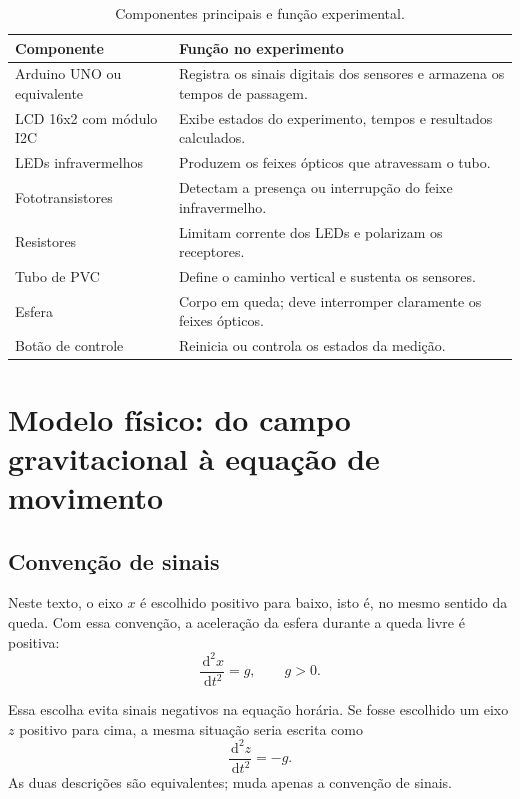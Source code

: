 \documentclass[11pt,a4paper]{article}
\newcommand{\dif}{\,\mathrm{d}}
\begin{document}
\begin{table}[htbp]
\centering
\caption{Componentes principais e função experimental.}
\label{tab:componentes}
\begin{tabularx}{\textwidth}{>{\raggedright\arraybackslash}p{}X}
\toprule
\textbf{Componente} & \textbf{Função no experimento} \\
\midrule
Arduino UNO ou equivalente & Registra os sinais digitais dos sensores e armazena os tempos de passagem. \\
LCD 16x2 com módulo I2C & Exibe estados do experimento, tempos e resultados calculados. \\
LEDs infravermelhos & Produzem os feixes ópticos que atravessam o tubo. \\
Fototransistores & Detectam a presença ou interrupção do feixe infravermelho. \\
Resistores & Limitam corrente dos LEDs e polarizam os receptores. \\
Tubo de PVC & Define o caminho vertical e sustenta os sensores. \\
Esfera & Corpo em queda; deve interromper claramente os feixes ópticos. \\
Botão de controle & Reinicia ou controla os estados da medição. \\
\bottomrule
\end{tabularx}
\end{table}

\section{Modelo físico: do campo gravitacional à equação de movimento}

\subsection{Convenção de sinais}

Neste texto, o eixo $x$ é escolhido positivo para baixo, isto é, no mesmo sentido da queda. Com essa convenção, a aceleração da esfera durante a queda livre é positiva:
\begin{equation}
  \frac{\dif^2x}{\dif t^2}=g,
  \qquad g>0.
  \label{eq:movimento_x_baixo}
\end{equation}

Essa escolha evita sinais negativos na equação horária. Se fosse escolhido um eixo $z$ positivo para cima, a mesma situação seria escrita como
\begin{equation}
  \frac{\dif^2z}{\dif t^2}=-g.
\end{equation}
As duas descrições são equivalentes; muda apenas a convenção de sinais.
\end{document}
